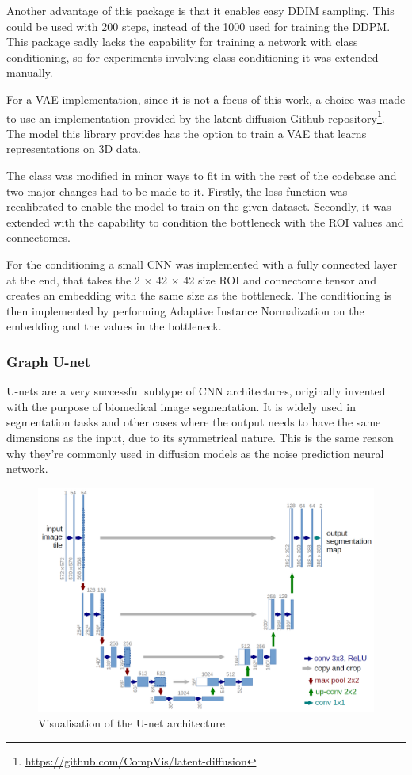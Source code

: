 	Another advantage of this package is that it enables easy DDIM sampling. This could be used with 200 steps, instead of the 1000 used for training the DDPM. This package sadly lacks the capability for training a network with class conditioning, so for experiments involving class conditioning it was extended manually.
	
	For a VAE implementation, since it is not a focus of this work, a choice was made to use an implementation provided by the latent-diffusion Github repository\footnote{\url{https://github.com/CompVis/latent-diffusion}}. The model this library provides has the option to train a VAE that learns representations on 3D data. 
	
	The class was modified in minor ways to fit in with the rest of the codebase and  two major changes had to be made to it. Firstly,  the loss function was recalibrated to enable the model to train on the given dataset. Secondly, it was extended with the capability to condition the bottleneck with the ROI values and connectomes. 
	
	For the conditioning a small CNN was implemented with a fully connected layer at the end, that takes the 2 × 42 × 42 size ROI and connectome tensor and creates an embedding with the same size as the bottleneck. The conditioning is then implemented by performing Adaptive Instance Normalization\cite{huang2017arbitrary} on the embedding and the values in the bottleneck.
	
	\subsubsection{Graph U-net}
	
	U-nets are a very successful subtype of CNN architectures, originally invented with the purpose of biomedical image segmentation\cite{ronneberger2015u}. It is widely used in segmentation tasks and other cases where the output needs to have the same dimensions as the input, due to its symmetrical nature. This is the same reason why they're commonly used in diffusion models as the noise prediction neural network\cite{ho2020denoising}.
	
	\begin{figure}[!h]
		\centering
		\label{fig:unet}		
		\includegraphics[width=\textwidth]{figures/u-net-architecture.png}
		\caption{Visualisation of the U-net architecture\cite{ronneberger2015u}}
	\end{figure}
	
